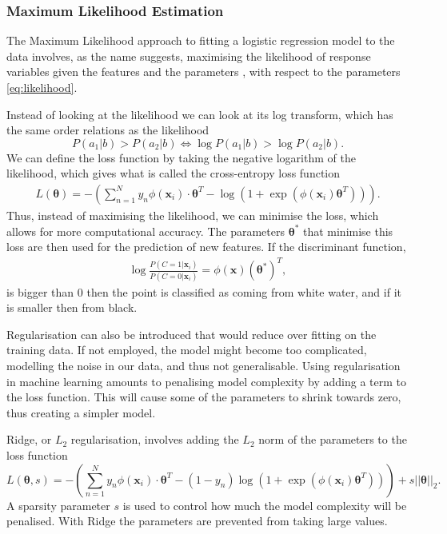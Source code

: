    
   
\subsubsection{Maximum Likelihood Estimation}

The Maximum Likelihood approach to fitting a logistic regression model to the data involves, as the name suggests, maximising the likelihood of response variables given the features and the parameters , with respect to the parameters \eqref{eq:likelihood}.

Instead of looking at the likelihood we can look at its log transform, which has the same order relations as the likelihood
\begin{equation}
	P(a_1|b) > P(a_2|b) \Leftrightarrow 	\log P(a_1|b) >\log P(a_2|b).
\end{equation} 
We can define the loss function by taking the negative logarithm of the likelihood, which gives what is called the cross-entropy loss function
\begin{align}
	L(\bm{\theta})= - \left(\sum_{n=1}^N y_n \phi\left(\mathbf{x}_{i}\right)\cdot\bm{\theta}^{T} -\log\left(1+\exp\left(\phi\left(\mathbf{x}_{i}\right)\bm{\theta}^{T}\right)\right) \right).
\end{align}
Thus, instead of maximising the likelihood, we can minimise the loss, which allows for more computational accuracy.  
The parameters $\bm{\theta}^*$ that minimise this loss are then used for the prediction of new features. If the discriminant function,
\begin{align}
	 \log \frac{P(C=1 |  \mathbf{x}_i)}{P(C = 0 |  \mathbf{x}_i)} = \phi( \mathbf{x}) (\bm{\theta}^*)^T,
\end{align}
 is bigger than 0 then the point is classified as coming from white water, and if it is smaller then from black. 
 
 Regularisation can also be introduced that would reduce over fitting on the training data. If not employed, the model might become too complicated, modelling the noise in our data, and thus not generalisable. Using regularisation in machine learning amounts to penalising model complexity by adding a term to the loss function. This will cause some of the parameters to shrink towards zero, thus creating a simpler model.
 
 Ridge, or $L_2$ regularisation, involves adding the $L_2$ norm of the parameters to the loss function
 \begin{equation}
 		L(\bm{\theta},s)= - \left(\sum_{n=1}^N y_n \phi\left(\mathbf{x}_{i}\right)\cdot\bm{\theta}^{T} -\left(1-y_n\right)\log\left(1+\exp\left(\phi\left(\mathbf{x}_{i}\right)\bm{\theta}^{T}\right)\right) \right) + s||\bm{\theta}||_2.
 \end{equation}
  A sparsity parameter $s$ is used to control how much the model complexity will be penalised. With Ridge the parameters are prevented from taking large values.
  
